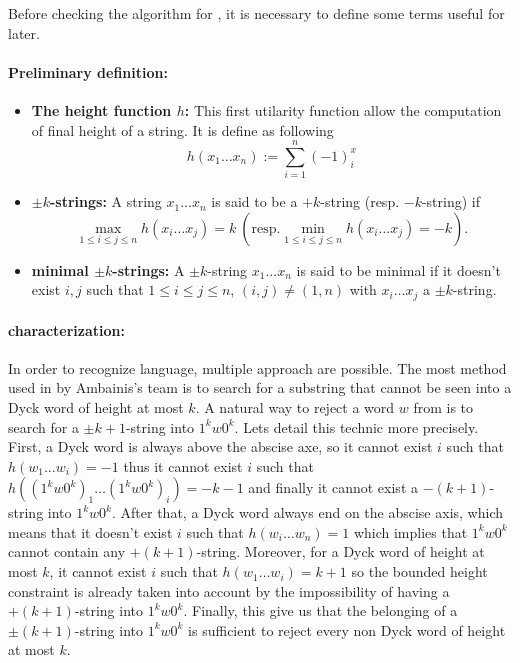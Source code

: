 Before checking the algorithm for , it is necessary to define some terms useful
for later.

\paragraph*{\textbf{Preliminary definition:}}

\begin{itemize}
    \item \textbf{The height function $h$:} This first utilarity function
          allow the computation of final height of a string. It is define as following
          \[h(x_1\ldots x_n) := \sum_{i=1}^n(-1)^x_i\]
    \item \textbf{$\pm k$-strings:} A string $x_1\ldots x_n$ is said to be a $+k$-string
          (resp. $-k$-string) if
          \[\max_{1\leq i\leq j \leq n} h(x_i \ldots x_j) = k\ \left(\textrm{resp.} \min_{1\leq i\leq j \leq n} h(x_i \ldots x_j) = -k\right).\]
    \item \textbf{minimal $\pm k$-strings:} A $\pm k$-string $x_1...x_n$ is said to be minimal
          if it doesn't exist $i, j$ such that $1 \leq i\leq j\leq n$, $(i, j) \neq (1, n)$
          with $x_i\ldots x_j$ a $\pm k$-string.
\end{itemize}

\paragraph*{\textbf{ characterization:}}
In order to recognize  language, multiple approach are possible.
The most method used in \cite{art:2DGrid} by Ambainis's team is to search
for a substring that cannot be seen into a Dyck word of height at most $k$.
A natural way to reject a word $w$ from  is to search for a $\pm k+1$-string
into $1^k w0^k$. Lets detail this technic more precisely. First, a Dyck word
is always above the abscise axe, so it cannot exist $i$ such that $h(w_1 \ldots w_i)=-1$
thus it cannot exist $i$ such that $h((1^k w0^k)_1 \ldots (1^k w0^k)_i)=-k-1$ and finally
it cannot exist a $-(k+1)$-string into $1^k w0^k$. After that, a Dyck word always end on
the abscise axis, which means that it doesn't exist $i$ such that $h(w_i \ldots w_n)=1$
which implies that $1^k w0^k$ cannot contain any $+(k+1)$-string. Moreover, for a Dyck word
of height at most $k$, it cannot exist $i$ such that $h(w_1\ldots w_i) = k+1$ so the
bounded height constraint is already taken into account by the impossibility of having a
$+(k+1)$-string into $1^k w0^k$. Finally, this give us that the belonging of a $\pm(k+1)$-string
into $1^k w0^k$ is sufficient to reject every non Dyck word of height at most $k$.

